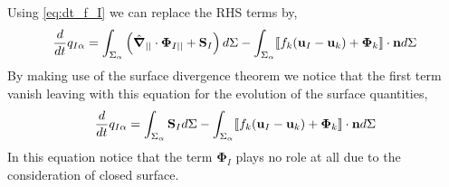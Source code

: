 Using \ref{eq:dt_f_I} we can replace the RHS terms by, 
\begin{equation}
    \frac{d}{d t}  q_{I\alpha}
    = \int_{\Sigma_\alpha} \left(
        \hat{\bm{\nabla}}_{||} \cdot \mathbf{\Phi}_{I||}
        + \textbf{S}_I
    \right) d\Sigma
    - \int_{\Sigma_\alpha} \llbracket 
        f_k (\textbf{u}_I - \textbf{u}_k)
        + \mathbf{\Phi}_k
     \rrbracket \cdot \textbf{n}
    d\Sigma
\end{equation}
By making use of the surface divergence theorem \citet{kanwal1998generalized} we notice that the first term vanish leaving with this equation for the evolution of the surface quantities, 
\begin{equation}
    \frac{d}{d t}  q_{I\alpha}
    = \int_{\Sigma_\alpha} 
        \textbf{S}_I
    d\Sigma
    - \int_{\Sigma_\alpha} \llbracket 
        f_k (\textbf{u}_I - \textbf{u}_k)
        + \mathbf{\Phi}_k
     \rrbracket \cdot \textbf{n}
    d\Sigma
    \label{eq:dt_q_I_alpha}
\end{equation}
In this equation notice that the term $\mathbf{\Phi}_I$ plays no role at all due to the consideration of closed surface. 



